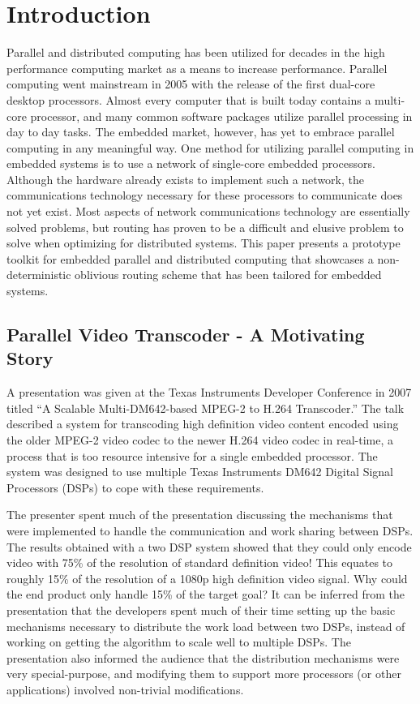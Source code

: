 \chapter{Introduction}\label{sec:introduction}

Parallel and distributed computing has been utilized for decades in the high performance computing market as a means to increase performance. Parallel computing went mainstream in 2005 with the release of the first dual-core desktop processors. Almost every computer that is built today contains a multi-core processor, and many common software packages utilize parallel processing in day to day tasks. The embedded market, however, has yet to embrace parallel computing in any meaningful way. One method for utilizing parallel computing in embedded systems is to use a network of single-core embedded processors. Although the hardware already exists to implement such a network, the communications technology necessary for these processors to communicate does not yet exist. Most aspects of network communications technology are essentially solved problems, but routing has proven to be a difficult and elusive problem to solve when optimizing for distributed systems. This paper presents a prototype toolkit for embedded parallel and distributed computing that showcases a non-deterministic oblivious routing scheme that has been tailored for embedded systems.

\section{Parallel Video Transcoder - A Motivating Story}\label{sec:introduction:motivating_story}

A presentation was given at the Texas Instruments Developer Conference in 2007 titled ``A Scalable Multi-DM642-based MPEG-2 to H.264 Transcoder.'' \cite{ref:2007-raman-h.264_parallel_transcoder} The talk described a system for transcoding high definition video content encoded using the older MPEG-2 video codec to the newer H.264 video codec in real-time, a process that is too resource intensive for a single embedded processor. The system was designed to use multiple Texas Instruments DM642 Digital Signal Processors (DSPs) to cope with these requirements. 

The presenter spent much of the presentation discussing the mechanisms that were implemented to handle the communication and work sharing between DSPs. The results obtained with a two DSP system showed that they could only encode video with 75\% of the resolution of standard definition video! This equates to roughly 15\% of the resolution of a 1080p high definition video signal. Why could the end product only handle 15\% of the target goal? It can be inferred from the presentation that the developers spent much of their time setting up the basic mechanisms necessary to distribute the work load between two DSPs, instead of working on getting the algorithm to scale well to multiple DSPs. The presentation also informed the audience that the distribution mechanisms were very special-purpose, and modifying them to support more processors (or other applications) involved non-trivial modifications.

